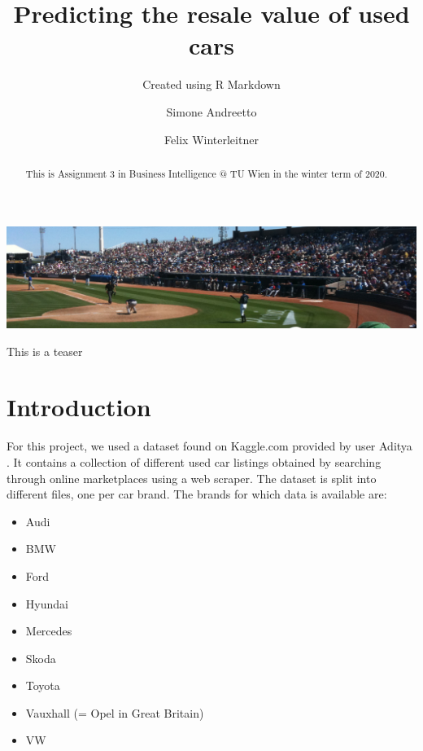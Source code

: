 \documentclass[sigchi]{acmart}
\def\tightlist{}
\begin{document}
\title{Predicting the resale value of used cars}
\subtitle{Created using R Markdown}

\author{Simone Andreetto}

\author{Felix Winterleitner}

\renewcommand{\shortauthors}{S. Andreetto et al.}


\begin{abstract}
This is Assignment 3 in Business Intelligence @ TU Wien in the winter term of 2020.
\end{abstract}



\begin{teaserfigure}
  \includegraphics[width=\textwidth]{sampleteaser}
  \caption{This is a teaser}
  \label{fig:teaser}
\end{teaserfigure}


\maketitle

\hypertarget{introduction}{%
\section{Introduction}\label{introduction}}

For this project, we used a dataset found on Kaggle.com provided by user Aditya \citep{Aditya}. It contains a collection of different used car listings obtained by searching through online marketplaces using a web scraper. The dataset is split into different files, one per car brand. The brands for which data is available are:

\begin{itemize}
\tightlist
\item
  Audi
\item
  BMW
\item
  Ford
\item
  Hyundai
\item
  Mercedes
\item
  Skoda
\item
  Toyota
\item
  Vauxhall (= Opel in Great Britain)
\item
  VW
\end{itemize}
\end{document}
